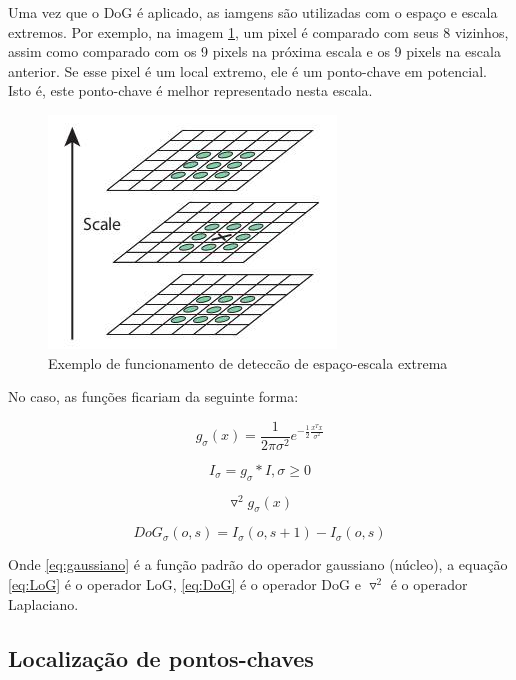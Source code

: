 Uma vez que o DoG é aplicado, as iamgens são utilizadas com o espaço e escala extremos. Por exemplo, na imagem \ref{fig:extrema}, um pixel é comparado com seus 8 vizinhos, assim como comparado com os 9 pixels na próxima escala e os 9 pixels na escala anterior. Se esse pixel é um local extremo, ele é um ponto-chave em potencial. Isto é, este ponto-chave é melhor representado nesta escala.

\begin{figure}
	\centering
	\includegraphics[width=0.35\linewidth]{figs/sift_local_extrema.jpg}
	\caption{%
	Exemplo de funcionamento de deteccão de espaço-escala extrema
	}\label{fig:extrema}
\end{figure}

No caso, as funções ficariam da seguinte forma: 

\begin{equation}
\label{eq:gaussiano}
	g_\sigma(x) = \frac{1}{2 \pi \sigma ^2} e^{-\frac{1}{2} \frac{x^T x}{\sigma ^2}}
\end{equation}

\begin{equation}
\label{eq:gaussianScaleSpace}
	I_\sigma = g_\sigma * I, \sigma \geq 0
\end{equation}

\begin{equation}
\label{eq:LoG}
	\triangledown^2	g_\sigma(x)
\end{equation}

\begin{equation}
\label{eq:DoG}
	DoG_\sigma(o,s) = I_\sigma(o,s+1) - I_\sigma(o,s)
\end{equation}


Onde \ref{eq:gaussiano} é a função padrão do operador gaussiano (núcleo), a equação \ref{eq:LoG} é o operador LoG,  \ref{eq:DoG} é o operador DoG e $\triangledown^2$ é o operador Laplaciano.

\subsection*{Localização de pontos-chaves}

